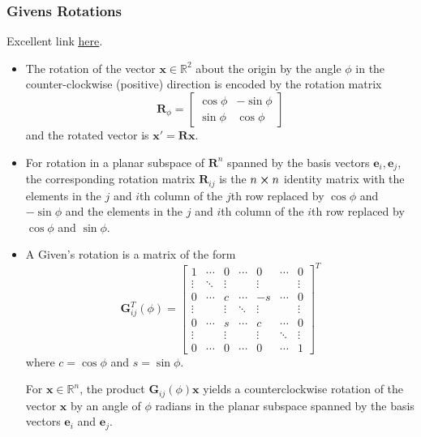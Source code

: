 \documentclass[11pt, a4paper]{article}
\newcommand{\R}{\mathbb{R}} %
\newcommand{\mat}[1]{\mathbf{#1}} %
\begin{document}
\subsubsection{Givens Rotations}
Excellent link \href{https://www.math.usm.edu/lambers/mat610/sum10/lecture9.pdf}{\underline{here}}.
\begin{itemize}
	\item The rotation of the vector $ \bm{x} \in \R^{2}$ about the origin by the angle $ \phi $ in the counter-clockwise (positive) direction is encoded by the rotation matrix
	\begin{equation*}
		\mat{R}_{\phi} =
		\begin{bmatrix}
			\cos \phi & - \sin \phi\\
			\sin \phi & \cos \phi
		\end{bmatrix}
	\end{equation*}
	and the rotated vector is $ \bm{x}' = \mat{R} \bm{x} $. 
	
	\item For rotation in a planar subspace of $ \mat{R}^{n} $ spanned by the basis vectors $ \bm{e}_{i}, \bm{e}_{j} $, the corresponding rotation matrix $ \mat{R}_{ij} $ is the $ n \cross n $ identity matrix with the elements in the $ j $ and $ i $th column of the $ j $th row replaced by $ \cos \phi $ and $ - \sin \phi $ and the elements in the $ j $ and $ i $th column of the $ i $th row replaced by $ \cos \phi $ and $ \sin \phi $.
	
	\item A Given's rotation is a matrix of the form
	\[
		\mat{G}^{T}_{ij}(\phi) = 
		\begin{bmatrix}
			1&\cdots &0&\cdots &0&\cdots &0\\
			\vdots &\ddots &\vdots &&\vdots &&\vdots \\
			0&\cdots &c&\cdots &-s&\cdots &0\\
			\vdots &&\vdots &\ddots &\vdots &&\vdots \\
			0&\cdots &s&\cdots &c&\cdots &0\\
			\vdots &&\vdots &&\vdots &\ddots &\vdots \\
			0&\cdots &0&\cdots &0&\cdots &1
		\end{bmatrix}^{T}
	\]
	where $ c = \cos \phi $ and $ s = \sin \phi $.
	
	For $ \bm{x} \in \R^{n} $, the product $ \mat{G}_{ij}(\phi) \bm{x} $ yields a counterclockwise rotation of the vector $ \bm{x} $ by an angle of $ \phi $ radians in the planar subspace spanned by the basis vectors $ \bm{e}_{i} $ and $ \bm{e}_{j} $.
	

\end{itemize}
\end{document}
